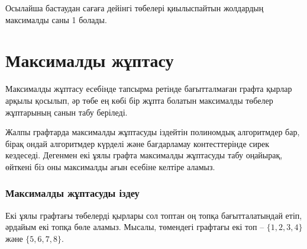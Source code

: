 Осылайша бастаудан сағаға дейінгі
төбелері қиылыспайтын жолдардың
максималды саны 1 болады.

\section{Максималды жұптасу}


Максималды жұптасу есебінде тапсырма ретінде бағытталмаған графта
қырлар арқылы қосылып, әр төбе ең көбі бір жұпта болатын 
максималды төбелер жұптарының санын табу беріледі.


Жалпы графтарда максималды жұптасуды іздейтін 
полиномдық алгоритмдер бар\cite{edm65}, бірақ
ондай алгоритмдер күрделі және 
бағдарламау контесттерінде сирек кездеседі. 
Дегенмен екі ұялы графта максималды жұптасуды 
табу оңайырақ, өйткені біз оны максималды 
ағын есебіне келтіре аламыз. 

\subsubsection{Максималды жұптасуды іздеу}

Екі ұялы графтағы төбелерді қырлары сол топтан оң топқа бағытталатындай етіп,
әрдайым екі топқа бөле аламыз. Мысалы, төмендегі графтағы екі топ --  
$\{1,2,3,4\}$ және $\{5,6,7,8\}$.

